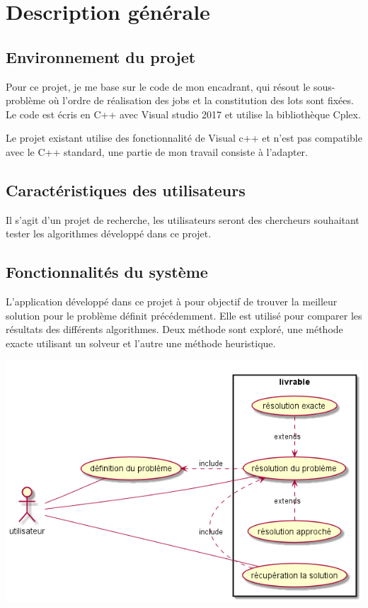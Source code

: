 \chapter{Description générale}

\section{Environnement du projet}
Pour ce projet, je me base sur le code de mon encadrant, qui résout le sous-problème où l'ordre de réalisation des jobs et la constitution des lots sont fixées.
Le code est écris en C++ avec Visual studio 2017 et utilise la bibliothèque Cplex.

Le projet existant utilise des fonctionnalité de Visual c++ et n'est pas compatible avec le C++ standard,
 une partie de mon travail consiste à l'adapter.
\section{Caractéristiques des utilisateurs}
Il s'agit d'un projet de recherche, les utilisateurs seront des chercheurs souhaitant tester les algorithmes développé dans ce projet.
 
\section{Fonctionnalités du système}
L'application développé dans ce projet à pour objectif de trouver la meilleur solution pour le problème définit précédemment.
Elle est utilisé pour comparer les résultats des différents algorithmes.
Deux méthode sont exploré, une méthode exacte utilisant un solveur et l'autre une méthode heuristique.

\includegraphics[width=\textwidth]{parts/description_generale/use_cases}

